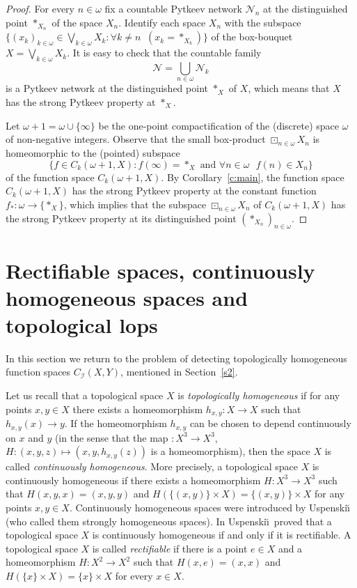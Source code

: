 \documentclass{amsart}
\theoremstyle{definition}
\begin{document}
\begin{proof} For every $n\in{\omega}$ fix a countable Pytkeev network $\mathcal N_n$ at the distinguished point $*_{X_n}$ of the space $X_n$. Identify each space $X_n$ with the subspace
 $\big\{(x_k)_{k\in{\omega}}\in\textstyle{\bigvee_{k\in{\omega}}}X_k:\forall k\ne n\;\; (x_k=*_{X_k})\big\}$ of the box-bouquet $X=\bigvee_{k\in{\omega}}X_k$.
It is easy to check that the countable family $$\mathcal N=\bigcup_{n\in{\omega}}\mathcal N_k$$ is a Pytkeev network at the distinguished point $*_X$ of $X$, which means that $X$ has the strong Pytkeev property at $*_X$.

Let ${\omega}+1={\omega}\cup\{\infty\}$ be the one-point compactification of the (discrete) space ${\omega}$ of non-negative integers. Observe that the small box-product ${\boxdot}_{n\in{\omega}}X_n$ is homeomorphic to the (pointed) subspace
$$\{f\in C_k({\omega}+1,X):f(\infty)=*_X\mbox{ and $\forall n\in{\omega}$ $f(n)\in X_n$}\}$$of the function space $C_k({\omega}+1,X)$.
By Corollary~\ref{c:main}, the function space $C_k({\omega}+1,X)$ has the strong Pytkeev property at the constant function $f_*:{\omega}\to\{*_X\}$, which implies that the subspace ${\boxdot}_{n\in{\omega}}X_n$ of $C_k({\omega}+1,X)$ has the strong Pytkeev property at its distinguished point $(*_{X_n})_{n\in{\omega}}$.
\end{proof}

\section{Rectifiable spaces, continuously homogeneous spaces and topological lops}\label{s4}

In this section we return to the problem of detecting topologically homogeneous function spaces $C_{\mathcal I}(X,Y)$, mentioned in Section~\ref{s2}.

Let us recall that a topological space $X$ is {\em topologically homogeneous} if for any points $x,y\in X$ there exists a homeomorphism $h_{x,y}:X\to X$ such that $h_{x,y}(x)\to y$. If the homeomorphism $h_{x,y}$ can be chosen to depend continuously on $x$ and $y$ (in the sense that the map $:X^3\to X^3$, $H:(x,y,z)\mapsto (x,y,h_{x,y}(z))$ is a homeomorphism), then the space $X$ is called {\em continuously homogeneous}. More precisely, a topological space $X$ is continuously homogeneous if there exists a homeomorphism $H:X^3\to X^3$ such that $H(x,y,x)=(x,y,y)$ and $H(\{(x,y)\}\times X)=\{(x,y)\}\times X$ for any points $x,y\in X$. Continuously homogeneous spaces were introduced by Uspenski\u\i\ \cite{Us} (who called them strongly homogeneous spaces). In \cite[Proposition 15]{Us} Uspenski\u\i\ proved that a topological space $X$ is continuously homogeneous if and only if it is rectifiable. A topological space $X$ is called {\em rectifiable} if there is a point $e\in X$ and a homeomorphism $H:X^2\to X^2$
such that $H(x,e)=(x,x)$ and $H(\{x\}\times X)=\{x\}\times X$ for every $x\in X$.
\end{document}

